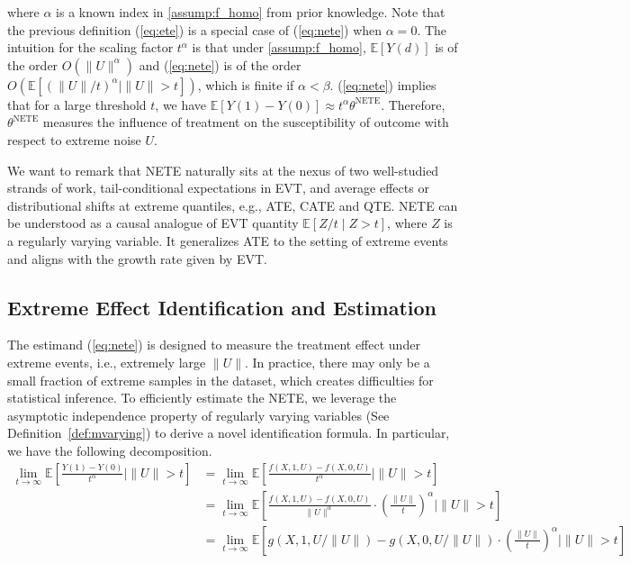 \documentclass[12pt]{article}
\theoremstyle{plain}
\theoremstyle{definition}
\newcommand{\tmop}[1]{\ensuremath{\operatorname{#1}}}
\begin{document}
where $\alpha$ is a known index in \cref{assump:f_homo} from prior knowledge. Note that the previous definition (\ref{eq:ete}) is a special case of (\ref{eq:nete}) when $\alpha = 0$. The intuition for the scaling factor $t^\alpha$ is that under \cref{assump:f_homo}, $\mathbb{E}[Y(d)] $ is of the order $ O(\| U \|^\alpha) $ and (\ref{eq:nete}) is of the order $ O(\mathbb{E}[(\|U\|/t)^\alpha \mid \|U\|>t]) $, which is finite if $\alpha < \beta$.  (\ref{eq:nete}) implies that for a large threshold $t$, we have $\mathbb{E}[ Y(1) - Y(0)] \approx t^\alpha \theta^{\tmop{NETE}} $. Therefore, $\theta^{\tmop{NETE}}$ measures the influence of treatment on the susceptibility of outcome with respect to extreme noise $U$. 

We want to remark that NETE naturally sits at the nexus of two well-studied strands of work, tail-conditional expectations in EVT, and average effects or distributional shifts at extreme quantiles, e.g., ATE, CATE and QTE. NETE can be understood as a causal analogue of EVT quantity $ \mathbb{E}[Z/t \mid Z > t] $, where $Z$ is a regularly varying variable. It generalizes ATE to the setting of extreme events and aligns with the growth rate given by EVT.  

\subsection{Extreme Effect Identification and Estimation}

The estimand (\ref{eq:nete}) is designed to measure the treatment effect under extreme events, i.e., extremely large $\|U\|$. In practice, there
may only be a small fraction of extreme samples in the dataset, which creates difficulties for statistical inference. To efficiently estimate the NETE, we leverage the asymptotic independence property of regularly varying variables
(See  Definition~\ref{def:mvarying}) to derive a novel identification formula.
In particular, we have the following decomposition.
\begin{align}
  \lim_{t \rightarrow \infty} \mathbb{E} \left[ \frac{Y (1) - Y
  (0)}{t^{\alpha}} \mid \|U\|> t \right] & = \lim_{t \rightarrow \infty}
  \mathbb{E} \left[ \frac{f (X, 1, U) - f (X, 0, U)}{t^{\alpha}} \mid \|U\|> t
  \right]  \label{eq:naive_id}\\
  & = \lim_{t \rightarrow \infty} \mathbb{E} \left[ \frac{f (X, 1, U) - f (X,
  0, U)}{\|U\|^{\alpha}} \cdot \left( \frac{\|U\|}{t} \right)^{\alpha} \mid
  \|U\|> t \right] \nonumber\\
  & = \lim_{t \rightarrow \infty} \mathbb{E} \left[ g (X, 1, U /\|U\|) - g
  (X, 0, U /\|U\|) \cdot \left( \frac{\|U\|}{t} \right)^{\alpha} \mid \|U\|> t
  \right]  \label{eq:naive_id2}
\end{align}
\end{document}
